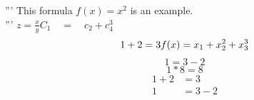 \documentclass{article}
\begin{document}
    \section{}
    '''
    This formula $f(x) = x^2$ is an example.\\
    '''
    $z = \frac{x}{y}$\quad $C_1 \quad = \quad c_2 + c_4^3$\\
    \begin{equation*}
        1 + 2 = 3\\
        f(x) = x_1 + x_2^2 + x_3^3
    \end{equation*}
    \begin{equation*}
        1 = 3 - 2
    \end{equation*}
    \begin{equation*}
        1 * 8 = 8
    \end{equation*}
    \begin{align*}
        1 + 2 &= 3\\
        1 &= 3-2
    \end{align*}
\end{document}
